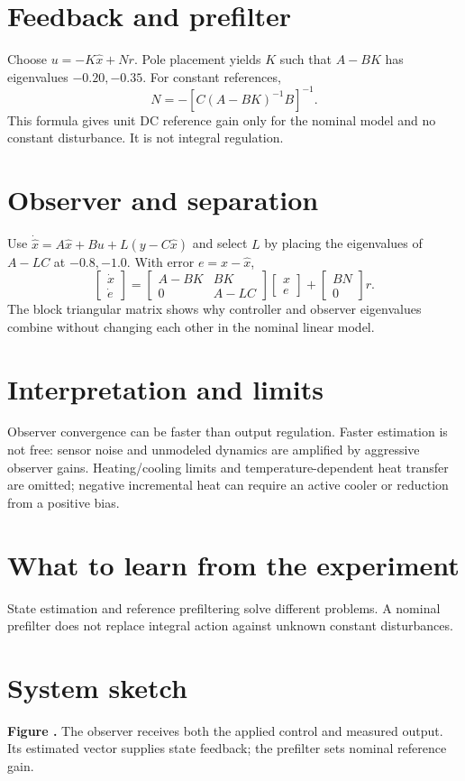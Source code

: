 \documentclass[10pt,a4paper]{article}
\begin{document}
\section{Feedback and prefilter}
Choose $u=-K\hat x+Nr$. Pole placement yields $K$ such that $A-BK$ has eigenvalues $-0.20,-0.35$. For constant references,
\[N=-\left[C(A-BK)^{-1}B\right]^{-1}.\]
This formula gives unit DC reference gain only for the nominal model and no constant disturbance. It is not integral regulation.
\section{Observer and separation}
Use $\dot{\hat x}=A\hat x+Bu+L(y-C\hat x)$ and select $L$ by placing the eigenvalues of $A-LC$ at $-0.8,-1.0$. With error $e=x-\hat x$,
\[\begin{bmatrix}\dot x\\\dot e\end{bmatrix}=
\begin{bmatrix}A-BK&BK\\0&A-LC\end{bmatrix}\begin{bmatrix}x\\e\end{bmatrix}+
\begin{bmatrix}BN\\0\end{bmatrix}r.\]
The block triangular matrix shows why controller and observer eigenvalues combine without changing each other in the nominal linear model.
\section{Interpretation and limits}
Observer convergence can be faster than output regulation. Faster estimation is not free: sensor noise and unmodeled dynamics are amplified by aggressive observer gains. Heating/cooling limits and temperature-dependent heat transfer are omitted; negative incremental heat can require an active cooler or reduction from a positive bias.
\section{What to learn from the experiment}
State estimation and reference prefiltering solve different problems. A nominal prefilter does not replace integral action against unknown constant disturbances.
\section{System sketch}
\begin{center}\resizebox{\ifdim\width>.98\linewidth.98\linewidth\else\width\fi}{!}{}
\par\small{}\label{fig:system}\textbf{Figure \thefigure.} The observer receives both the applied control and measured output. Its estimated vector supplies state feedback; the prefilter sets nominal reference gain.\end{center}
\end{document}

